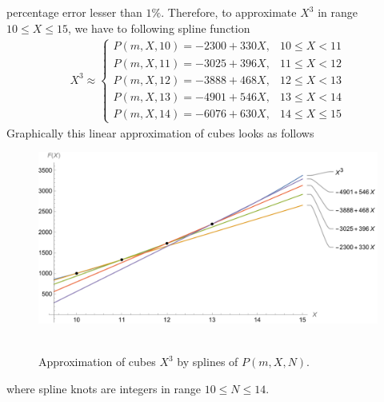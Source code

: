 percentage error lesser than $1\%$.
Therefore, to approximate $X^3$ in range $10 \leq X \leq 15$, we have to following spline function
\begin{align*}
    X^3 \approx
    \begin{cases}
        P(m,X,10) = -2300 + 330X, & 10 \leq X < 11 \\
        P(m,X,11) = -3025 + 396X, & 11 \leq X < 12 \\
        P(m,X,12) = -3888 + 468X, & 12 \leq X < 13 \\
        P(m,X,13) = -4901 + 546X, & 13 \leq X < 14 \\
        P(m,X,14) = -6076 + 630X, & 14 \leq X \leq 15
    \end{cases}
\end{align*}
Graphically this linear approximation of cubes looks as follows
\begin{figure}[H]
    \centering
    \includegraphics[width=1\textwidth]{sections/images/08_plots_of_cubes_power_with_p_2_10_15}
    ~\caption{Approximation of cubes $X^3$ by splines of $P(m,X,N)$.
    }\label{fig:08_plots_of_cubes_power_with_p_2_10_15}
\end{figure}
where spline knots are integers in range $10 \leq N \leq 14$.


